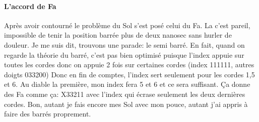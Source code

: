 \documentclass[a4paper,twoside]{article}
\begin{document}
\paragraph{L'accord de Fa}
Après avoir contourné le problème du Sol s'est posé celui du Fa. La
c'est pareil, impossible de tenir la position barrée plus de deux
nanosec sans hurler de douleur.  Je me suis dit, trouvons une parade:
le semi barré.  En fait, quand on regarde la théorie du barré, c'est
pas bien optimisé puisque l'index appuie sur toutes les cordes donc on
appuie 2 fois sur certaines cordes (index 111111, autres doigts 033200)
Donc en fin de comptes, l'index sert seulement pour les cordes 1,5 et
6. Au diable la première, mon index fera 5 et 6 et ce sera suffisant.
Ça donne des Fa comme ça: X33211 avec l'index qui écrase seulement les
deux dernières cordes.  Bon, autant je fais encore mes Sol avec mon
pouce, autant j'ai appris à faire des barrés proprement.
\end{document}
